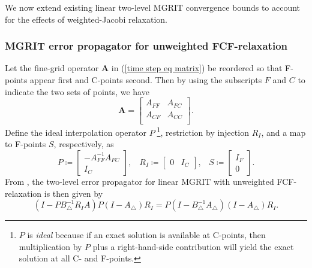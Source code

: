 \documentclass[VANCOUVER,STIX1COL]{WileyNJD-v2}
\begin{document}
We now extend existing linear two-level MGRIT convergence bounds \cite{Do2016,So2019} to account for the effects of weighted-Jacobi relaxation. 

\subsubsection{MGRIT error propagator for unweighted FCF-relaxation}

Let the fine-grid operator $\mathbf{A}$ in (\ref{time step eq matrix}) be reordered so that F-points appear first and C-points second.  Then by using the subscripts $F$ and $C$ to indicate the two sets of points, we have
$$\mathbf{A}=
\begin{bmatrix}
A_{FF} & A_{FC} \\
A_{CF} & A_{CC}\\
\end{bmatrix}.$$
Define the ideal interpolation operator $P\;$\footnote{$P$ is \textit{ideal} because if an exact solution is available at C-points, then
multiplication by $P$ plus a right-hand-side contribution will yield the exact solution at all C- and F-points.},
restriction by injection $R_I$, and a map to F-points $S$, respectively, as
$$ P \coloneqq \begin{bmatrix} -A_{FF}^{-1}A_{FC} \\
I_C \end{bmatrix}, \hspace{10pt}
R_I \coloneqq \begin{bmatrix} 0 & I_C \end{bmatrix}, \hspace{10pt}
S \coloneqq \begin{bmatrix}
I_F\\ 0 \end{bmatrix}.$$
{From \cite{Fa2014}, the two-level error propagator for linear MGRIT with unweighted FCF-relaxation is then given by}
\begin{equation} \label{two level error FCF}
(I - P B_{\triangle}^{-1} R_I A)P(I - A_{\triangle})R_I = P(I - B_{\triangle}^{-1} A_{\triangle}) (I - A_{\triangle})R_I.
\end{equation}
\end{document}
